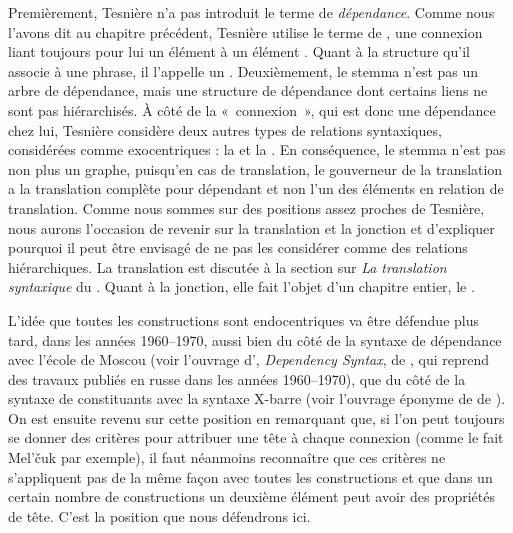 {    Premièrement, Tesnière n’a pas introduit le terme de \textit{dépendance}. Comme nous l’avons dit au chapitre précédent, Tesnière utilise le terme de {}, une connexion liant toujours pour lui un élément  à un élément . Quant à la structure qu’il associe à une phrase, il l’appelle un . Deuxièmement, le stemma n’est pas un arbre de dépendance, mais une structure de dépendance dont certains liens ne sont pas hiérarchisés. À côté de la «~connexion~», qui est donc une dépendance chez lui, Tesnière considère deux autres types de relations syntaxiques, considérées comme exocentriques : la  et la . En conséquence, le stemma n’est pas non plus un graphe, puisqu’en cas de translation, le gouverneur de la translation a la translation complète pour dépendant et non l’un des éléments en relation de translation. Comme nous sommes sur des positions assez proches de Tesnière, nous aurons l’occasion de revenir sur la translation et la jonction et d’expliquer pourquoi il peut être envisagé de ne pas les considérer comme des relations hiérarchiques. La translation est discutée à la section sur \textit{La translation syntaxique} du . Quant à la jonction, elle fait l’objet d’un chapitre entier, le .

    L’idée que toutes les constructions sont endocentriques va être défendue plus tard, dans les années 1960--1970, aussi bien du côté de la syntaxe de dépendance avec l’école de Moscou (voir l’ouvrage d’, \textit{Dependency Syntax}, de \citeyear{melcuk1988dependency}, qui reprend des travaux publiés en russe dans les années 1960--1970), que du côté de la syntaxe de constituants avec la syntaxe X-barre (voir l’ouvrage éponyme de  de \citeyear{jackendoff1977x}). On est ensuite revenu sur cette position en remarquant que, si l’on peut toujours se donner des critères pour attribuer une tête à chaque connexion (comme le fait Mel’čuk par exemple), il faut néanmoins reconnaître que ces critères ne s’appliquent pas de la même façon avec toutes les constructions et que dans un certain nombre de constructions un deuxième élément peut avoir des propriétés de tête. C’est la position que nous défendrons ici.

}
